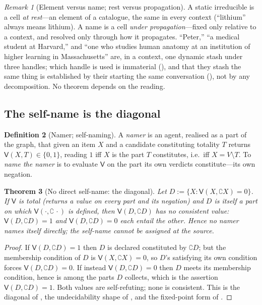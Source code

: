 \documentclass[twocolumn,11pt,a4paper]{article}
\theoremstyle{sup}
\newtheorem{theorem}{Theorem}[section]
\theoremstyle{definition}
\newtheorem{definition}[theorem]{Definition}
\theoremstyle{remark}
\newtheorem{remark}[theorem]{Remark}
\newcommand{\V}{V}
\newcommand{\co}{\complement}
\begin{document}
\begin{remark}[Element versus name; rest versus propagation]
\label{rem:element-name}
A static irreducible is a cell \emph{at rest}---an element of a catalogue, the
same in every context (``lithium'' always means lithium). A name is a cell
\emph{under propagation}---fixed only relative to a context, and resolved only
through how it propagates. ``Peter,'' ``a medical student at Harvard,'' and ``one
who studies human anatomy at an institution of higher learning in Massachusetts''
are, in a context, one dynamic stash under three handles; which handle is used is
immaterial (), and that they stash the same thing is
established by their starting the same conversation (),
not by any decomposition. No theorem depends on the reading.
\end{remark}

\subsection{The self-name is the diagonal}

\begin{definition}[Namer; self-naming]
\label{def:namer}
A \emph{namer} is an agent, realised as a part of the graph, that given an item
$X$ and a candidate constituting totality $T$ returns $\mathsf{V}(X,T)\in\{0,1\}$,
reading $1$ iff $X$ is the part $T$ constitutes, i.e.\ iff $X=\V\setminus T$. To
\emph{name the namer} is to evaluate $\mathsf{V}$ on the part its own verdicts
constitute---its own negation.
\end{definition}

\begin{theorem}[No direct self-name: the diagonal]
\label{thm:self-diagonal}
Let $D:=\{X:\mathsf{V}(X,\co X)=0\}$. If $\mathsf{V}$ is total (returns a value on
every part and its negation) and $D$ is itself a part on which
$\mathsf{V}(\cdot,\co\,\cdot)$ is defined, then $\mathsf{V}(D,\co D)$ has no
consistent value: $\mathsf{V}(D,\co D)=1$ and $\mathsf{V}(D,\co D)=0$ each entail
the other. Hence no namer names itself directly; the self-name cannot be
assigned at the source.
\end{theorem}

\begin{proof}
If $\mathsf{V}(D,\co D)=1$ then $D$ is declared constituted by $\co D$; but the
membership condition of $D$ is $\mathsf{V}(X,\co X)=0$, so $D$'s satisfying its
own condition forces $\mathsf{V}(D,\co D)=0$. If instead $\mathsf{V}(D,\co D)=0$
then $D$ meets its membership condition, hence is among the parts $D$ collects,
which is the assertion $\mathsf{V}(D,\co D)=1$. Both values are self-refuting;
none is consistent. This is the diagonal of \citet{cantor1891,russell1903}, the
undecidability shape of \citet{godel1931,tarski1936}, and the fixed-point form of
\citet{lawvere1969}.
\end{proof}
\end{document}
